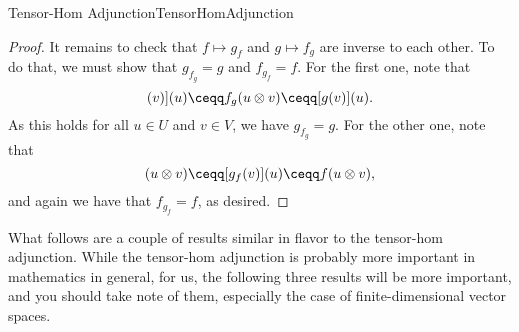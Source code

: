 \begin{thm}{Tensor-Hom Adjunction}{TensorHomAdjunction}
\begin{proof}
		It remains to check that $f\mapsto g_f$ and $g\mapsto f_g$ are inverse to each other.  To do that, we must show that $g_{f_g}=g$ and $f_{g_f}=f$.  For the first one, note that
		\begin{equation}
		[[g_{f_g}](v)](u)\ceqq f_g(u\otimes v)\ceqq [g(v)](u).
		\end{equation}
		As this holds for all $u\in U$ and $v\in V$, we have $g_{f_g}=g$.  For the other one, note that
		\begin{equation}
		[f_{g_f}](u\otimes v)\ceqq [g_f(v)](u)\ceqq f(u\otimes v),
		\end{equation}
		and again we have that $f_{g_f}=f$, as desired.
	\end{proof}
\end{thm}
What follows are a couple of results similar in flavor to the tensor-hom adjunction.  While the tensor-hom adjunction is probably more important in mathematics in general, for us, the following three results will be more important, and you should take note of them, especially the case of finite-dimensional vector spaces.

